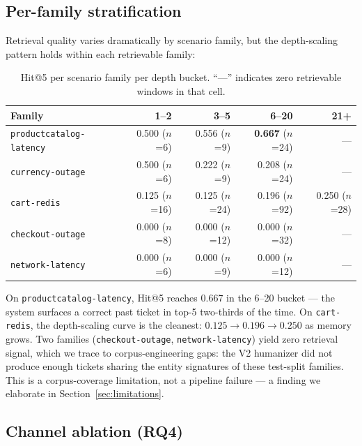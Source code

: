 \subsection{Per-family stratification}

Retrieval quality varies dramatically by scenario family, but the depth-scaling pattern holds within each retrievable family:

\begin{table}[h]
\centering
\small
\caption{\sota{} Hit@5 per scenario family per depth bucket. ``---'' indicates zero retrievable windows in that cell.}
\label{tab:per-family}
\begin{tabular}{lrrrr}
\toprule
Family & 1--2 & 3--5 & 6--20 & 21+ \\
\midrule
\texttt{productcatalog-latency}  & 0.500 ($n$=6)  & 0.556 ($n$=9)  & \textbf{0.667} ($n$=24) & ---             \\
\texttt{currency-outage}         & 0.500 ($n$=6)  & 0.222 ($n$=9)  & 0.208 ($n$=24)          & ---             \\
\texttt{cart-redis}              & 0.125 ($n$=16) & 0.125 ($n$=24) & 0.196 ($n$=92)          & 0.250 ($n$=28)  \\
\texttt{checkout-outage}         & 0.000 ($n$=8)  & 0.000 ($n$=12) & 0.000 ($n$=32)          & ---             \\
\texttt{network-latency}         & 0.000 ($n$=6)  & 0.000 ($n$=9)  & 0.000 ($n$=12)          & ---             \\
\bottomrule
\end{tabular}
\end{table}

On \texttt{productcatalog-latency}, Hit@5 reaches 0.667 in the 6--20 bucket --- the system surfaces a correct past ticket in top-5 two-thirds of the time. On \texttt{cart-redis}, the depth-scaling curve is the cleanest: $0.125 \to 0.196 \to 0.250$ as memory grows. Two families (\texttt{checkout-outage}, \texttt{network-latency}) yield zero retrieval signal, which we trace to corpus-engineering gaps: the V2 humanizer did not produce enough tickets sharing the entity signatures of these test-split families. This is a corpus-coverage limitation, not a pipeline failure --- a finding we elaborate in Section~\ref{sec:limitations}.

\subsection{Channel ablation (RQ4)}

